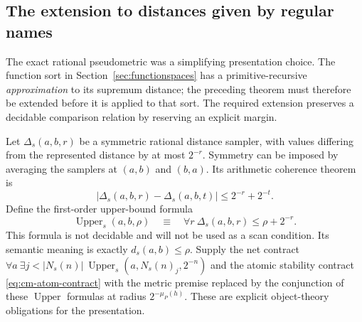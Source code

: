 \subsection{The extension to distances given by regular names}
\label{subsec:cm-named-distance}

The exact rational pseudometric was a simplifying presentation choice.
The function sort in Section~\ref{sec:functionspaces} has a
primitive-recursive \emph{approximation} to its supremum distance;
the preceding theorem must therefore be extended before it is applied
to that sort. The required extension preserves a decidable comparison
relation by reserving an explicit margin.

Let $\Delta_s(a,b,r)$ be a symmetric rational distance sampler,
with values differing from the represented distance by at most $2^{-r}$.
Symmetry can be imposed by averaging the samplers at $(a,b)$ and $(b,a)$.
Its arithmetic coherence theorem is
\begin{equation}
 |\Delta_s(a,b,r)-\Delta_s(a,b,t)|\leq2^{-r}+2^{-t}.
 \label{eq:cm-distance-coherence}
\end{equation}
Define the first-order upper-bound formula
\begin{equation}
 \operatorname{Upper}_s(a,b,\rho)\quad\equiv\quad
 \forall r\ 
    \Delta_s(a,b,r)\leq \rho+2^{-r}.
 \label{eq:cm-upper}
\end{equation}
This formula is not decidable and will not be used as a scan condition.
Its semantic meaning is exactly $d_s(a,b)\leq\rho$.
Supply the net contract
$\forall a\ \exists j<|N_s(n)|\
\operatorname{Upper}_s(a,N_s(n)_j,2^{-n})$
and the atomic stability contract \eqref{eq:cm-atom-contract} with
the metric premise replaced by the conjunction of these
$\operatorname{Upper}$ formulas at radius $2^{-\mu_P(h)}$.
These are explicit object-theory obligations for the presentation.


